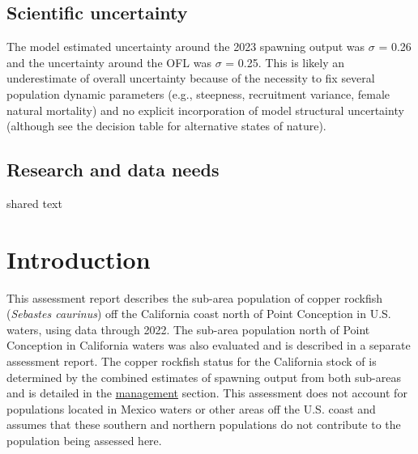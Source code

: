 \documentclass[11pt,
  english,
  letterpaper,
]{article}
\begin{document}
\hypertarget{scientific-uncertainty}{%
\subsection*{Scientific uncertainty}\label{scientific-uncertainty}}

The model estimated uncertainty around the 2023 spawning output was \(\sigma\) = 0.26 and the uncertainty around the OFL was \(\sigma\) = 0.25. This is likely an underestimate of overall uncertainty because of the necessity to fix several population dynamic parameters (e.g., steepness, recruitment variance, female natural mortality) and no explicit incorporation of model structural uncertainty (although see the decision table for alternative states of nature).

\hypertarget{research-and-data-needs}{%
\subsection*{Research and data needs}\label{research-and-data-needs}}

shared text

\pagebreak
\setlength{\parskip}{5mm plus1mm minus1mm}
\setcounter{page}{1}
\renewcommand{\thefigure}{\arabic{figure}}
\renewcommand{\thetable}{\arabic{table}}
\setcounter{table}{0}
\setcounter{figure}{0}

\hypertarget{introduction}{%
\section{Introduction}\label{introduction}}

This assessment report describes the sub-area population of copper rockfish (\emph{Sebastes caurinus}) off the California coast north of Point Conception in U.S. waters, using data through 2022. The sub-area population north of Point Conception in California waters was also evaluated and is described in a separate assessment report. The copper rockfish status for the California stock of is determined by the combined estimates of spawning output from both sub-areas and is detailed in the \protect\hyperlink{management}{management} section. This assessment does not account for populations located in Mexico waters or other areas off the U.S. coast and assumes that these southern and northern populations do not contribute to the population being assessed here.
\end{document}

